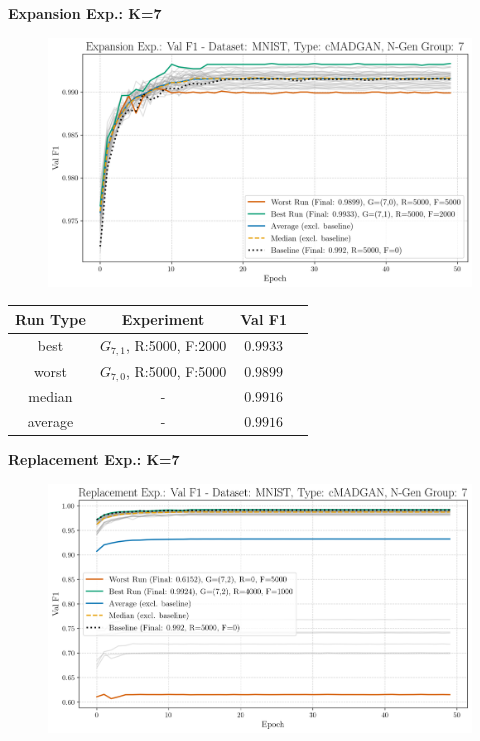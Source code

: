 \newpage
\noindent\textbf{Expansion Exp.: K=7}
\begin{figure}[htbp]
	\centering
	\includegraphics[width=.85\textwidth]{abb/strat_classifier_performance/MNIST_STRATIFIED_CLASSIFIERS_cMADGAN_NEW/expansion_experiments/val_f1_score_cMADGAN_MNIST_n_gen_7_all.png}
	\label{fig:app_strat_class_performance_expansion_exp._val_f1_score_7}
\end{figure}
\begin{table}[H]
	\vspace{-1em}
	\centering
	\begin{tabular}{|c|c|c|c|}
		\hline
		Run Type & Experiment & Val F1 \\ \hline
		best & \(G_{7, 1}\), R:5000, F:2000 & $0.9933$\\ \hline
		worst & \(G_{7, 0}\), R:5000, F:5000 & $0.9899$\\ \hline
		median & - & $0.9916$\\ \hline
		average & - & $0.9916$
		\\ \hline
	\end{tabular}
\end{table}
\noindent\textbf{Replacement Exp.: K=7}
\begin{figure}[htbp]
	\centering
	\includegraphics[width=.85\textwidth]{abb/strat_classifier_performance/MNIST_STRATIFIED_CLASSIFIERS_cMADGAN_NEW/replacement_experiments/val_f1_score_cMADGAN_MNIST_n_gen_7_all.png}
	\label{fig:app_strat_class_performance_replacement_exp._val_f1_score_7}
\end{figure}
